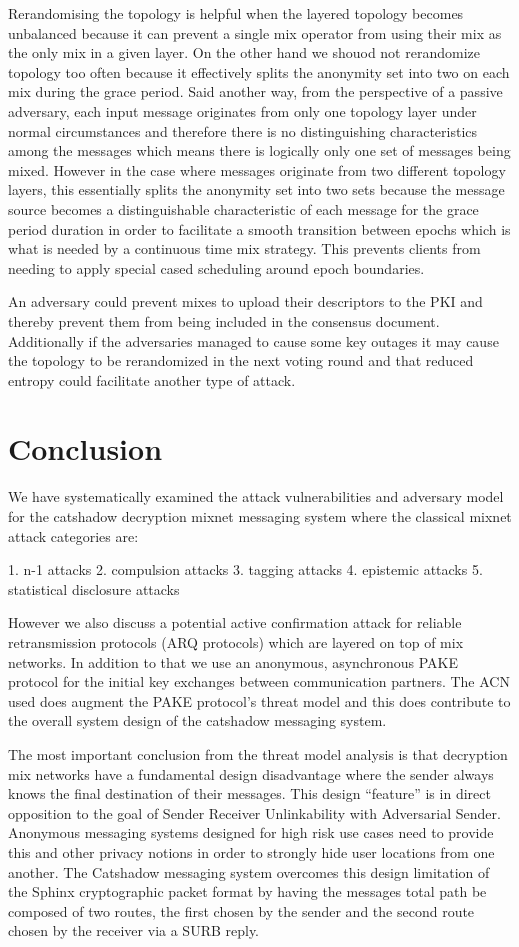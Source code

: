 \documentclass[conference]{IEEEtran}
\begin{document}
Rerandomising the topology is helpful when the layered topology becomes
unbalanced because it can prevent a single mix operator from using
their mix as the only mix in a given layer. On the other hand we
shouod not rerandomize topology too often because it effectively
splits the anonymity set into two on each mix during the grace
period. Said another way, from the perspective of a passive adversary,
each input message originates from only one topology layer under
normal circumstances and therefore there is no distinguishing
characteristics among the messages which means there is logically only
one set of messages being mixed. However in the case where messages
originate from two different topology layers, this essentially splits
the anonymity set into two sets because the message source becomes a
distinguishable characteristic of each message for the grace period
duration in order to facilitate a smooth transition between epochs
which is what is needed by a continuous time mix strategy. This
prevents clients from needing to apply special cased scheduling around
epoch boundaries.

An adversary could prevent mixes to upload their descriptors to the PKI
and thereby prevent them from being included in the consensus document.
Additionally if the adversaries managed to cause some key outages it may
cause the topology to be rerandomized in the next voting round and that
reduced entropy could facilitate another type of attack.

\section{Conclusion}
We have systematically examined the attack vulnerabilities and
adversary model for the catshadow decryption mixnet messaging system
where the classical mixnet attack categories are:

1. n-1 attacks
2. compulsion attacks
3. tagging attacks
4. epistemic attacks
5. statistical disclosure attacks

However we also discuss a potential active confirmation attack for
reliable retransmission protocols (ARQ protocols) which are layered on
top of mix networks. In addition to that we use an anonymous,
asynchronous PAKE protocol for the initial key exchanges between
communication partners. The ACN used does augment the PAKE protocol's
threat model and this does contribute to the overall system design of
the catshadow messaging system.

The most important conclusion from the threat model analysis is that
decryption mix networks have a fundamental design disadvantage where
the sender always knows the final destination of their messages. This
design ``feature'' is in direct opposition to the goal of Sender
Receiver Unlinkability with Adversarial Sender. Anonymous messaging
systems designed for high risk use cases need to provide this and
other privacy notions in order to strongly hide user locations from
one another. The Catshadow messaging system overcomes this design
limitation of the Sphinx cryptographic packet format by having the
messages total path be composed of two routes, the first chosen by the
sender and the second route chosen by the receiver via a SURB reply.
\end{document}
